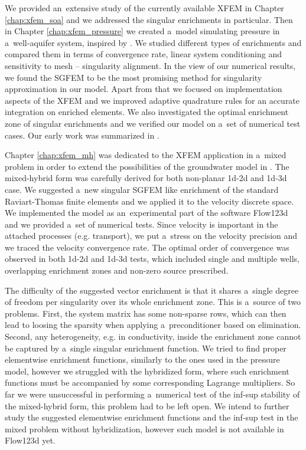 \documentclass[bibliography=totocnumbered,dvipsnames,FM,Dis, EN]{tulthesis_autoreferat}
\begin{document}
We provided an~extensive study of the currently available XFEM \cite{fries_xfem_overview_2010, babuska_stable_2012} in Chapter \ref{chap:xfem_soa}
and we addressed the singular enrichments in particular. 
Then in Chapter \ref{chap:xfem_pressure} we created a~model simulating pressure in a~well-aquifer system, inspired by \cite{gracie_modelling_2010, craig_using_2011}.
We studied different types of enrichments and compared them in terms of
convergence rate, linear system conditioning and sensitivity to mesh -- singularity alignment.
In the view of our numerical results, we found the SGFEM to be the most promising method
for singularity approximation in our model.
Apart from that we focused on implementation aspects of the XFEM and we improved adaptive quadrature rules
for an accurate integration on enriched elements. We also investigated the optimal enrichment zone
of singular enrichments and we verified our model on a~set of numerical test cases.
Our early work was summarized in \cite{exner_2016}.


Chapter \ref{chap:xfem_mh} was dedicated to the XFEM application in a~mixed problem
in order to extend the possibilities of the groundwater model in \cite{sistek_bddc_2015, flow123d}.
The mixed-hybrid form was carefully derived for both non-planar 1d-2d and 1d-3d case.
We suggested a~new singular SGFEM like enrichment of the standard Raviart-Thomas finite elements
and we applied it to the velocity discrete space.
We implemented the model as an~experimental part of the software Flow123d
and we provided a~set of numerical tests.
Since velocity is important in the attached processes (e.g. transport),
we put a~stress on the velocity precision and we traced the velocity convergence rate.
The optimal order of convergence was observed in both 1d-2d and 1d-3d tests,
which included single and multiple wells, overlapping enrichment zones and non-zero source prescribed.

The difficulty of the suggested vector enrichment is that it shares a~single degree of freedom per singularity
over its whole enrichment zone. This is a~source of two problems. First, the system matrix has some non-sparse rows,
which can then lead to loosing the sparsity when applying a~preconditioner based on elimination.
Second, any heterogeneity, e.g. in conductivity, inside the enrichment zone cannot be captured by
a~single singular enrichment function.
We tried to find proper elementwise enrichment functions, similarly to the ones used in the pressure model,
however we struggled with the hybridized form, where such enrichment functions must be accompanied
by some corresponding Lagrange multipliers.
So far we were unsuccessful in performing a~numerical test of the inf-sup stability
of the mixed-hybrid form, this problem had to be left open.
We intend to further study the suggested elementwise enrichment functions and the inf-sup test in the mixed problem without hybridization,
however such model is not available in Flow123d yet.
\end{document}
